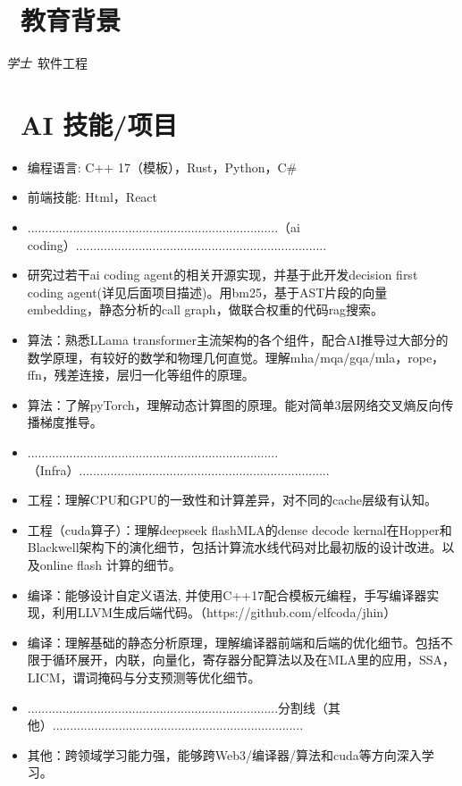 \documentclass{resume}
\begin{document}


 
\section{\faGraduationCap\  教育背景}
\textit{学士}\ 软件工程

\section{\faCogs\ AI 技能/项目}
\begin{itemize}[parsep=0.5ex]
  \item 编程语言:  C++ 17（模板），Rust，Python，C\#
  \item 前端技能: Html，React
  \item ........................................................................（ai coding）........................................................................
  \item 研究过若干ai coding agent的相关开源实现，并基于此开发decision first coding agent(详见后面项目描述)。用bm25，基于AST片段的向量embedding，静态分析的call graph，做联合权重的代码rag搜索。
  \item 算法：熟悉LLama transformer主流架构的各个组件，配合AI推导过大部分的数学原理，有较好的数学和物理几何直觉。理解mha/mqa/gqa/mla，rope，ffn，残差连接，层归一化等组件的原理。
  \item 算法：了解pyTorch，理解动态计算图的原理。能对简单3层网络交叉熵反向传播梯度推导。
  \item ........................................................................（Infra）........................................................................
  \item 工程：理解CPU和GPU的一致性和计算差异，对不同的cache层级有认知。
  \item 工程（cuda算子）：理解deepseek flashMLA的dense decode kernal在Hopper和Blackwell架构下的演化细节，包括计算流水线代码对比最初版的设计改进。以及online flash 计算的细节。
  \item 编译：能够设计自定义语法, 并使用C++17配合模板元编程，手写编译器实现，利用LLVM生成后端代码。（https://github.com/elfcoda/jhin）
  \item 编译：理解基础的静态分析原理，理解编译器前端和后端的优化细节。包括不限于循环展开，内联，向量化，寄存器分配算法以及在MLA里的应用，SSA，LICM，谓词掩码与分支预测等优化细节。
  
  \item ........................................................................分割线（其他）........................................................................

  \item 其他：跨领域学习能力强，能够跨Web3/编译器/算法和cuda等方向深入学习。
\end{itemize}
\end{document}
